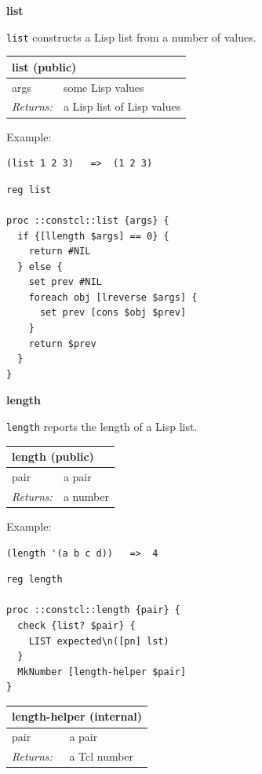 \documentclass[twoside,9pt]{report}
\begin{document}
\textbf{list}


\texttt{list} constructs a Lisp list from a number of values.

\begin{tabular}{ |l l| }
\hline
\multicolumn{2}{|l|}{list (public)} \\
\hline
args & some Lisp values \\
\textit{Returns:} & a Lisp list of Lisp values \\
\hline
\end{tabular}


Example:

\noindent\makebox[\linewidth]{\rule{\linewidth}{0.4pt}}
\begin{lstlisting}
(list 1 2 3)   =>  (1 2 3)
\end{lstlisting}
\noindent\makebox[\linewidth]{\rule{\linewidth}{0.4pt}}
\noindent\makebox[\linewidth]{\rule{\linewidth}{0.4pt}}
\begin{lstlisting}
reg list
 
proc ::constcl::list {args} {
  if {[llength $args] == 0} {
    return #NIL
  } else {
    set prev #NIL
    foreach obj [lreverse $args] {
      set prev [cons $obj $prev]
    }
    return $prev
  }
}
\end{lstlisting}
\noindent\makebox[\linewidth]{\rule{\linewidth}{0.4pt}}

\textbf{length}


\texttt{length} reports the length of a Lisp list.

\begin{tabular}{ |l l| }
\hline
\multicolumn{2}{|l|}{length (public)} \\
\hline
pair & a pair \\
\textit{Returns:} & a number \\
\hline
\end{tabular}


Example:

\noindent\makebox[\linewidth]{\rule{\linewidth}{0.4pt}}
\begin{lstlisting}
(length '(a b c d))   =>  4
\end{lstlisting}
\noindent\makebox[\linewidth]{\rule{\linewidth}{0.4pt}}
\noindent\makebox[\linewidth]{\rule{\linewidth}{0.4pt}}
\begin{lstlisting}
reg length
 
proc ::constcl::length {pair} {
  check {list? $pair} {
    LIST expected\n([pn] lst)
  }
  MkNumber [length-helper $pair]
}
\end{lstlisting}
\noindent\makebox[\linewidth]{\rule{\linewidth}{0.4pt}}
\begin{tabular}{ |l l| }
\hline
\multicolumn{2}{|l|}{length-helper (internal)} \\
\hline
pair & a pair \\
\textit{Returns:} & a Tcl number \\
\hline
\end{tabular}
\end{document}
